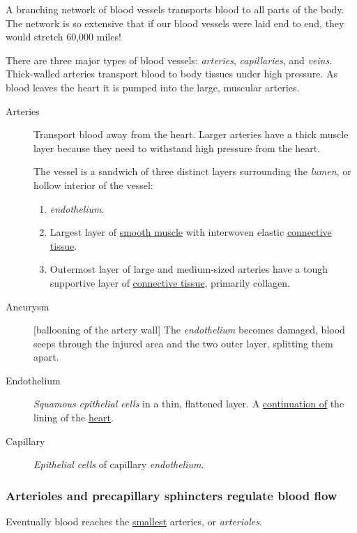 \documentclass[11pt]{article}
\begin{document}
A branching network of blood vessels transports blood to all parts of the body.
The network is so extensive that if our blood vessels were laid end to end, they
would stretch 60,000 miles!

There are three major types of blood vessels: \emph{arteries}, \emph{capillaries}, and \emph{veins}.
Thick-walled arteries transport blood to body tissues under high pressure. As
blood leaves the heart it is pumped into the large, muscular arteries.

\begin{description}
\item[{Arteries}] Transport blood away from the heart. Larger arteries have a thick
muscle layer because they need to withstand high pressure from the heart.

The vessel is a sandwich of three distinct layers surrounding the \emph{lumen}, or
hollow interior of the vessel:
\begin{enumerate}
\item \emph{endothelium}.
\item Largest layer of \uline{smooth muscle} with interwoven elastic \uline{connective tissue}.
\item Outermost layer of large and medium-sized arteries have a tough supportive
layer of \uline{connective tissue}, primarily collagen.
\end{enumerate}

\item[{Aneurysm}] [ballooning of the artery wall] The \emph{endothelium} becomes damaged,
blood seeps through the injured area and the two outer layer, splitting
them apart.
\item[{Endothelium}] \emph{Squamous} \emph{epithelial cells} in a thin, flattened layer. A
\uline{continuation of} the lining of the \uline{heart}.
\item[{Capillary}] \emph{Epithelial cells} of capillary \emph{endothelium}.
\end{description}

\subsubsection{Arterioles and precapillary sphincters regulate blood flow}
\label{sec:orgbe0d665}
Eventually blood reaches the \uline{smallest} arteries, or \emph{arterioles}.
\end{document}
